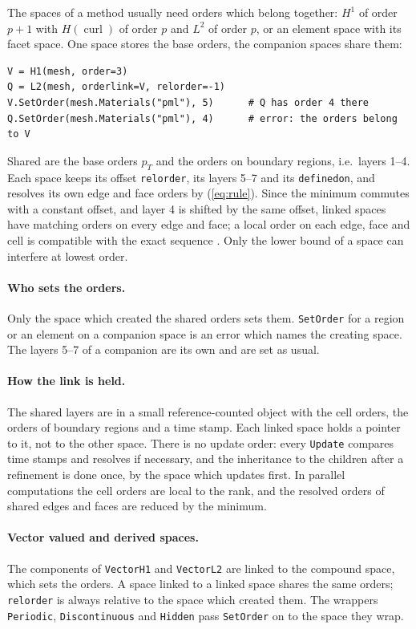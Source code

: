 \documentclass[10pt,a4paper]{article}
\newcommand{\code}[1]{\texttt{#1}}
\begin{document}
The spaces of a method usually need orders which belong together: $H^1$ of order $p+1$ with $H(\operatorname{curl})$ of order $p$ and $L^2$ of order $p$, or an element space with its facet space. One space stores the base orders, the companion spaces share them:
\begin{lstlisting}
V = H1(mesh, order=3)
Q = L2(mesh, orderlink=V, relorder=-1)
V.SetOrder(mesh.Materials("pml"), 5)      # Q has order 4 there
Q.SetOrder(mesh.Materials("pml"), 4)      # error: the orders belong to V
\end{lstlisting}
Shared are the base orders $p_T$ and the orders on boundary regions, i.e.\ layers 1--4. Each space keeps its offset \code{relorder}, its layers 5--7 and its \code{definedon}, and resolves its own edge and face orders by (\ref{eq:rule}). Since the minimum commutes with a constant offset, and layer 4 is shifted by the same offset, linked spaces have matching orders on every edge and face; a local order on each edge, face and cell is compatible with the exact sequence \cite{z06}. Only the lower bound of a space can interfere at lowest order.

\paragraph{Who sets the orders.} Only the space which created the shared orders sets them. \code{SetOrder} for a region or an element on a companion space is an error which names the creating space. The layers 5--7 of a companion are its own and are set as usual.

\paragraph{How the link is held.} The shared layers are in a small reference-counted object with the cell orders, the orders of boundary regions and a time stamp. Each linked space holds a pointer to it, not to the other space. There is no update order: every \code{Update} compares time stamps and resolves if necessary, and the inheritance to the children after a refinement is done once, by the space which updates first. In parallel computations the cell orders are local to the rank, and the resolved orders of shared edges and faces are reduced by the minimum.

\paragraph{Vector valued and derived spaces.} The components of \code{VectorH1} and \code{VectorL2} are linked to the compound space, which sets the orders. A space linked to a linked space shares the same orders; \code{relorder} is always relative to the space which created them. The wrappers \code{Periodic}, \code{Discontinuous} and \code{Hidden} pass \code{SetOrder} on to the space they wrap.
\end{document}

